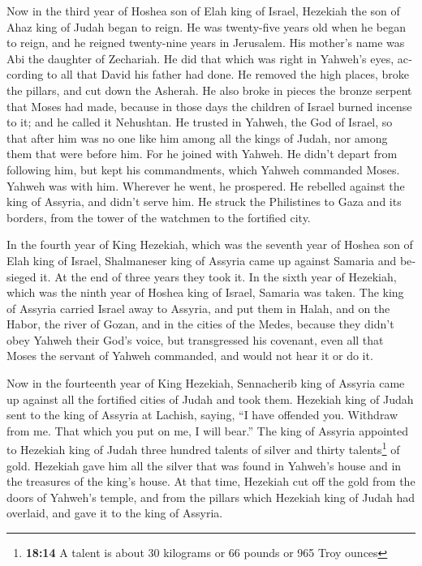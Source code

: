 \begin{paracol}{2}
\begin{otherlanguage}{english}
 Now in the third year of Hoshea son of Elah king of
Israel, Hezekiah the son of Ahaz king of Judah began to reign.
 He was twenty-five years old when he began to reign, and
he reigned twenty-nine years in Jerusalem. His mother's name was Abi the
daughter of Zechariah.  He did that which was right in
Yahweh's eyes, according to all that David his father had done.
 He removed the high places, broke the pillars, and cut
down the Asherah. He also broke in pieces the bronze serpent that Moses
had made, because in those days the children of Israel burned incense to
it; and he called it Nehushtan.  He trusted in Yahweh, the
God of Israel, so that after him was no one like him among all the kings
of Judah, nor among them that were before him.  For he
joined with Yahweh. He didn't depart from following him, but kept his
commandments, which Yahweh commanded Moses.  Yahweh was
with him. Wherever he went, he prospered. He rebelled against the king
of Assyria, and didn't serve him.  He struck the
Philistines to Gaza and its borders, from the tower of the watchmen to
the fortified city.

 In the fourth year of King Hezekiah, which was the
seventh year of Hoshea son of Elah king of Israel, Shalmaneser king of
Assyria came up against Samaria and besieged it.  At the
end of three years they took it. In the sixth year of Hezekiah, which
was the ninth year of Hoshea king of Israel, Samaria was taken.
 The king of Assyria carried Israel away to Assyria, and
put them in Halah, and on the Habor, the river of Gozan, and in the
cities of the Medes,  because they didn't obey Yahweh
their God's voice, but transgressed his covenant, even all that Moses
the servant of Yahweh commanded, and would not hear it or do it.

 Now in the fourteenth year of King Hezekiah, Sennacherib
king of Assyria came up against all the fortified cities of Judah and
took them.  Hezekiah king of Judah sent to the king of
Assyria at Lachish, saying, ``I have offended you. Withdraw from me.
That which you put on me, I will bear.'' The king of Assyria appointed
to Hezekiah king of Judah three hundred talents of silver and thirty
talents\footnote{\textbf{18:14} A talent is about 30 kilograms or 66
  pounds or 965 Troy ounces} of gold.  Hezekiah gave him
all the silver that was found in Yahweh's house and in the treasures of
the king's house.  At that time, Hezekiah cut off the
gold from the doors of Yahweh's temple, and from the pillars which
Hezekiah king of Judah had overlaid, and gave it to the king of Assyria.


\end{otherlanguage}
\end{paracol}
